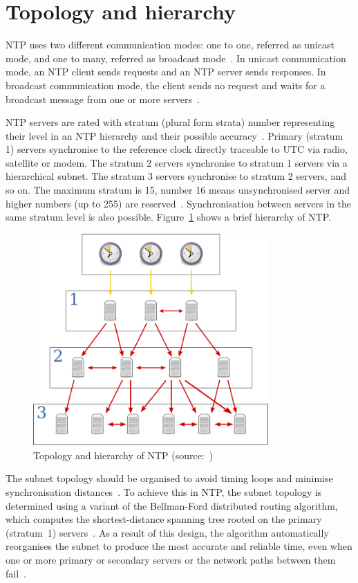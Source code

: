 
\section{Topology and hierarchy}\label{sec:ntp-topology}
NTP uses two different communication modes:
one to one, referred as unicast mode, and one to many, referred as broadcast mode~\cite{rfc5905}.
In unicast communication mode, an NTP client sends requests and an NTP server sends responses.
In broadcast communication mode, the client sends no request
and waits for a broadcast message from one or more servers~\cite{rfc5905}.

NTP servers are rated with stratum (plural form strata) number representing their level
in an NTP hierarchy and their possible accuracy~\cite{rfc5905}.
Primary (stratum 1) servers synchronise to the reference clock directly traceable to UTC via
radio, satellite or modem.
The stratum 2 servers synchronise to stratum 1
servers via a hierarchical subnet.
The stratum 3 servers synchronise to stratum 2 servers, and so on.
The maximum stratum is 15, number 16 means unsynchronised server
and higher numbers (up to 255) are reserved~\cite{rfc5905}.
Synchronisation between servers in the same stratum level is also possible.
Figure~\ref{fig:ntp-hierarchy} shows a brief hierarchy of NTP.
\begin{figure}
  \centering
  \includegraphics[width=9cm,keepaspectratio]{fig/Network_Time_Protocol_servers_and_clients.pdf}
  \caption{Topology and hierarchy of NTP (source:~\cite{wikimedia-ntp})}
  \label{fig:ntp-hierarchy}
  \bigskip
\end{figure}
The subnet topology should be organised to avoid timing loops
and minimise synchronisation distances~\cite{rfc5905}.
To achieve this in NTP, the subnet topology is determined using a variant
of the Bellman-Ford distributed routing algorithm, which computes
the shortest-distance spanning tree rooted on the primary (stratum~1) servers~\cite{rfc5905}.
As a result of this design, the
algorithm automatically reorganises the subnet to produce the most accurate and reliable time,
even when one or more primary or secondary servers or the network paths between them fail~\cite{rfc5905}.
